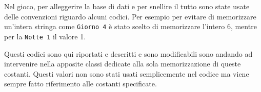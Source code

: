 Nel gioco, per alleggerire la base di dati e per snellire il tutto sono state usate delle convenzioni riguardo alcuni codici. Per esempio per evitare di memorizzare un'intera stringa come \texttt{Giorno 4} è stato scelto di memorizzare l'intero 6, mentre per la \texttt{Notte 1} il valore 1.

Questi codici sono qui riportati e descritti e sono modificabili sono andando ad intervenire nella apposite classi dedicate alla sola memorizzazione di queste costanti. Questi valori non sono stati usati semplicemente nel codice ma viene sempre fatto riferimento alle costanti specificate.